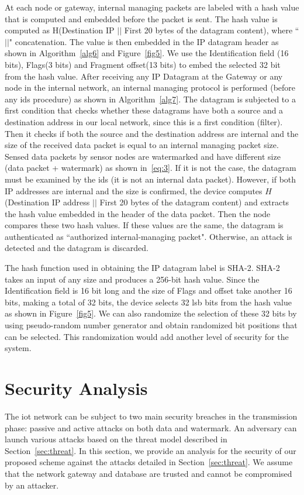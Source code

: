 \documentclass{llncs}
\begin{document}
At each node or gateway, internal managing packets are labeled with a hash value that is computed and embedded before the packet is sent. The hash value is computed as H(Destination IP $||$ First 20 bytes of the datagram content), where ``$||$" concatenation. The value is then embedded in the IP datagram header as shown in Algorithm~\ref{alg6} and Figure~\ref{fig5}. We use the Identification field (16 bits), Flags(3 bits) and Fragment offset(13 bits) to embed the selected 32 bit from the hash value. After receiving any IP Datagram at the Gateway or any node in the internal network, an internal managing protocol is performed (before any \gls*{ids} procedure) as shown in Algorithm~\ref{alg7}. The datagram is subjected to a first condition that checks whether these datagrams have both a source and a destination address in our local network, since this is a first condition (filter). Then it checks if both the source and the destination address are internal and the size of the received data packet is equal to an internal managing packet size. Sensed data packets by sensor nodes are watermarked and have different size (data packet + watermark) as shown in~\ref{eq:3}. If it is not the case, the datagram must be examined by the \gls*{ids} (it is not an internal data packet). However, if both IP addresses are internal and the size is confirmed, the device computes $H$(Destination IP address $||$ First 20 bytes of the datagram content) and extracts the hash value embedded in the header of the data packet. Then the node compares these two hash values. If these values are the same, the datagram is authenticated as ``authorized internal-managing packet". Otherwise, an attack is detected and the datagram is discarded. 


The hash function used in obtaining the IP datagram label is SHA-2. SHA-2 takes an input of any size and produces a 256-bit hash value. Since the Identification field is 16 bit long and the size of Flags and offset take another 16 bits, making a total of 32 bits, the device selects 32 \gls*{lsb} bits from the hash value as shown in Figure~\ref{fig5}. We can also randomize the selection of these 32 bits by using pseudo-random number generator and obtain randomized bit positions that can be selected. This randomization would add another level of security for the system. 


\section{Security Analysis}\label{sec:security}
The \gls*{iot} network can be subject to two main security breaches in the transmission phase: passive and active attacks on both data and watermark. An adversary can launch various attacks based on the threat model described in Section~\ref{sec:threat}. In this section, we provide an analysis for the security of our proposed scheme against the attacks detailed in Section~\ref{sec:threat}. We assume that the network gateway and database are trusted and cannot be compromised by an attacker. 
\end{document}
